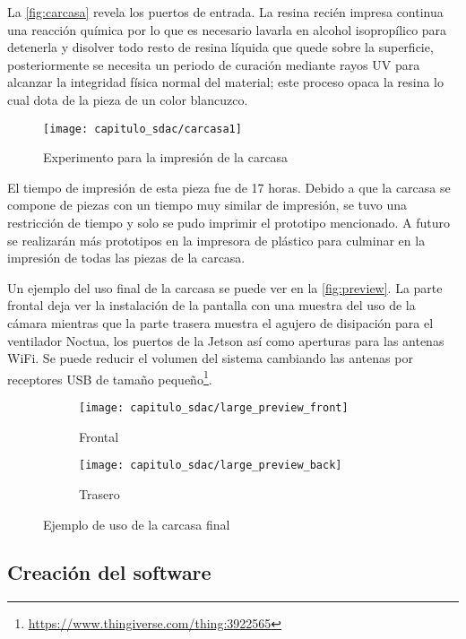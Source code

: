 La \autoref{fig:carcasa} revela los puertos de entrada. La resina recién impresa
continua una reacción química por lo que es necesario lavarla en alcohol
isopropílico para detenerla y disolver todo resto de resina líquida que quede
sobre la superficie, posteriormente se necesita un periodo de curación mediante
rayos UV para alcanzar la integridad física normal del material; este proceso
opaca la resina lo cual dota de la pieza de un color blancuzco.

\begin{figure}[H]
    \centering
    \texttt{[image: capitulo\_sdac/carcasa1]}
    \caption{Experimento para la impresión de la carcasa}\label{fig:carcasa}
\end{figure}

El tiempo de impresión de esta pieza fue de 17 horas. Debido a que la carcasa se
compone de piezas con un tiempo muy similar de impresión, se tuvo una
restricción de tiempo y solo se pudo imprimir el prototipo mencionado. A futuro
se realizarán más prototipos en la impresora de plástico para culminar en la
impresión de todas las piezas de la carcasa.

Un ejemplo del uso final de la carcasa se puede ver en la \autoref{fig:preview}.
La parte frontal deja ver la instalación de la pantalla con una muestra del uso
de la cámara mientras que la parte trasera muestra el agujero de disipación para
el ventilador Noctua, los puertos de la Jetson así como aperturas para las
antenas WiFi. Se puede reducir el volumen del sistema cambiando las antenas por
receptores USB de tamaño
pequeño\footnote{\url{https://www.thingiverse.com/thing:3922565}}.

\begin{figure}[H]
    \centering
    \begin{subfigure}{.5\textwidth}
        \centering
        \texttt{[image: capitulo\_sdac/large\_preview\_front]}
        \caption{Frontal}
    \end{subfigure}%
    \begin{subfigure}{.5\textwidth}
        \centering
        \texttt{[image: capitulo\_sdac/large\_preview\_back]}
        \caption{Trasero}
    \end{subfigure}
    \caption{Ejemplo de uso de la carcasa final}\label{fig:preview}
\end{figure}

\subsection{Creación del software}

